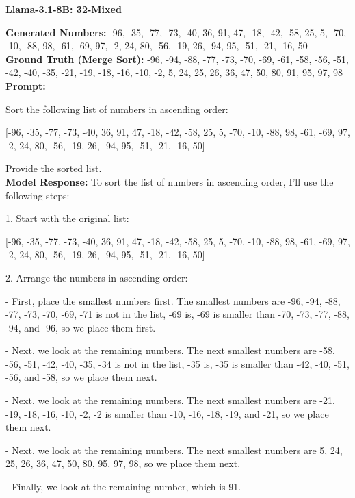 \begin{figure*}
\begin{AIbox}{\bf{\large Llama-3.1-8B: 32-Mixed}}
\vspace{0.5cm}

\textbf{Generated Numbers:} -96, -35, -77, -73, -40, 36, 91, 47, -18, -42, -58, 25, 5, -70, -10, -88, 98, -61, -69, 97, -2, 24, 80, -56, -19, 26, -94, 95, -51, -21, -16, 50
\\

\textbf{Ground Truth (Merge Sort):} -96, -94, -88, -77, -73, -70, -69, -61, -58, -56, -51, -42, -40, -35, -21, -19, -18, -16, -10, -2, 5, 24, 25, 26, 36, 47, 50, 80, 91, 95, 97, 98
\\

\textbf{Prompt:}

Sort the following list of numbers in ascending order:

[-96, -35, -77, -73, -40, 36, 91, 47, -18, -42, -58, 25, 5, -70, -10, -88, 98, -61, -69, 97, -2, 24, 80, -56, -19, 26, -94, 95, -51, -21, -16, 50]

Provide the sorted list.
\\

\textbf{Model Response:}
To sort the list of numbers in ascending order, I'll use the following steps:

1. Start with the original list: 

[-96, -35, -77, -73, -40, 36, 91, 47, -18, -42, -58, 25, 5, -70, -10, -88, 98, -61, -69, 97, -2, 24, 80, -56, -19, 26, -94, 95, -51, -21, -16, 50]

2. Arrange the numbers in ascending order:

- First, place the smallest numbers first. The smallest numbers are -96, -94, -88, -77, -73, -70, -69, -71 is not in the list, -69 is, -69 is smaller than -70, -73, -77, -88, -94, and -96, so we place them first.

- Next, we look at the remaining numbers. The next smallest numbers are -58, -56, -51, -42, -40, -35, -34 is not in the list, -35 is, -35 is smaller than -42, -40, -51, -56, and -58, so we place them next.

- Next, we look at the remaining numbers. The next smallest numbers are -21, -19, -18, -16, -10, -2, -2 is smaller than -10, -16, -18, -19, and -21, so we place them next.

- Next, we look at the remaining numbers. The next smallest numbers are 5, 24, 25, 26, 36, 47, 50, 80, 95, 97, 98, so we place them next.

- Finally, we look at the remaining number, which is 91.


\end{AIbox}
\end{figure*}
